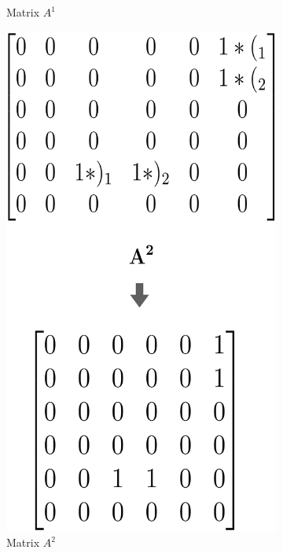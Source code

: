 \documentclass[xcolor=table,english]{beamer}
\begin{document}
\begin{frame}[fragile]
\begin{figure}[w]
\begin{subfigure}[b]{0.2\textwidth}
            \caption{Matrix $A^1$}
        \end{subfigure}
        \hfill
        \begin{subfigure}[b]{0.268\textwidth}
            \includegraphics[width=\textwidth]{figures/cfpq_2.png}
            \caption{Matrix $A^2$}
        \end{subfigure}
        \hfill
        \begin{subfigure}[b]{0.297\textwidth}

\end{subfigure}
\end{figure}
\end{frame}
\end{document}
